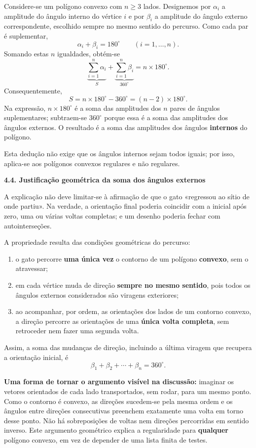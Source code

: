 Considere-se um polígono convexo com $n\geq3$ lados. Designemos por
$\alpha_i$ a amplitude do ângulo interno do vértice $i$ e por
$\beta_i$ a amplitude do ângulo externo correspondente, escolhido
sempre no mesmo sentido do percurso. Como cada par é suplementar,
\[
\alpha_i+\beta_i=180^\circ
\qquad(i=1,\ldots,n).
\]
Somando estas $n$ igualdades, obtém-se
\[
\underbrace{\sum_{i=1}^{n}\alpha_i}_{S}
+\underbrace{\sum_{i=1}^{n}\beta_i}_{360^\circ}
=n\times180^\circ.
\]
Consequentemente,
\[
\boxed{S=n\times180^\circ-360^\circ=(n-2)\times180^\circ}.
\]
Na expressão, $n\times180^\circ$ é a soma das amplitudes dos
$n$ pares de ângulos suplementares; subtraem-se $360^\circ$ porque
essa é a soma das amplitudes dos ângulos externos. O resultado é a
soma das amplitudes dos ângulos \textbf{internos} do polígono.

Esta dedução não exige que os ângulos internos sejam todos iguais;
por isso, aplica-se aos polígonos convexos regulares e não regulares.

\noindent\textbf{4.4. Justificação geométrica da soma dos ângulos externos}

A explicação não deve limitar-se à afirmação de que o gato
«regressou ao sítio de onde partiu». Na verdade, a orientação final
poderia coincidir com a inicial após zero, uma ou várias voltas
completas; e um desenho poderia fechar com autointerseções.

A propriedade resulta das condições geométricas do percurso:
\begin{enumerate}[label=\textbf{(\roman*)},leftmargin=1.15cm,itemsep=2pt,topsep=3pt]
\item o gato percorre \textbf{uma única vez} o contorno de um polígono
\textbf{convexo}, sem o atravessar;
\item em cada vértice muda de direção \textbf{sempre no mesmo sentido},
pois todos os ângulos externos considerados são viragens exteriores;
\item ao acompanhar, por ordem, as orientações dos lados de um
contorno convexo, a direção percorre as orientações de uma
\textbf{única volta completa}, sem retroceder nem fazer uma segunda volta.
\end{enumerate}

Assim, a soma das mudanças de direção, incluindo a última viragem
que recupera a orientação inicial, é
\[
\boxed{\beta_1+\beta_2+\cdots+\beta_n=360^\circ}.
\]

\textbf{Uma forma de tornar o argumento visível na discussão:}
imaginar os vetores orientados de cada lado transportados, sem
rodar, para um mesmo ponto. Como o contorno é convexo, as direções
sucedem-se pela mesma ordem e os ângulos entre direções consecutivas
preenchem exatamente uma volta em torno desse ponto. Não há
sobreposições de voltas nem direções percorridas em sentido inverso.
Este argumento geométrico explica a regularidade para \textbf{qualquer}
polígono convexo, em vez de depender de uma lista finita de testes.

